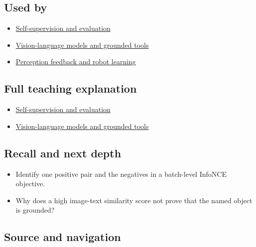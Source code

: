 \subsection{Used by}\label{appendix-772f1fd96148-used-by}

\begin{itemize}
\tightlist
\item
  \hyperref[04-visual-computing-ii-ch031-self-supervision-and-evaluation]{Self-supervision and evaluation}
\item
  \hyperref[04-visual-computing-ii-ch031-vision-language-models-and-grounded-tools]{Vision-language models and grounded tools}
\item
  \hyperref[appendix-b0c42da325f1]{Perception feedback and robot learning}
\end{itemize}

\subsection{Full teaching explanation}\label{appendix-772f1fd96148-full-teaching-explanation}

\begin{itemize}
\tightlist
\item
  \hyperref[04-visual-computing-ii-ch031-self-supervision-and-evaluation]{Self-supervision and evaluation}
\item
  \hyperref[04-visual-computing-ii-ch031-vision-language-models-and-grounded-tools]{Vision-language models and grounded tools}
\end{itemize}

\subsection{Recall and next depth}\label{appendix-772f1fd96148-recall-and-next-depth}

\begin{itemize}
\tightlist
\item
  Identify one positive pair and the negatives in a batch-level InfoNCE objective.
\item
  Why does a high image-text similarity score not prove that the named object is grounded?
\end{itemize}

\subsection{Source and navigation}\label{appendix-772f1fd96148-source-and-navigation}

